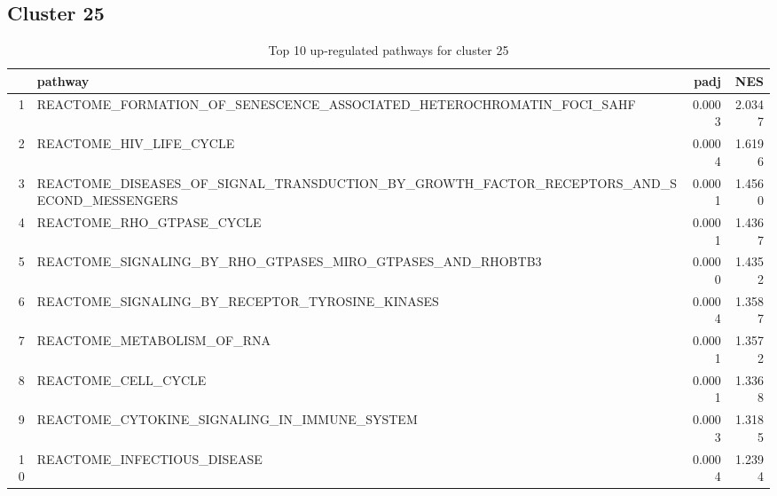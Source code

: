 \documentclass{article}
\begin{document}
\subsection{Cluster 25 }
\begin{table}[H]
\centering
\begin{tabularx}{\textwidth}{rlrr}
  \hline
 & pathway & padj & NES \\ 
  \hline
1 & REACTOME\_FORMATION\_OF\_SENESCENCE\_ASSOCIATED\_HETEROCHROMATIN\_FOCI\_SAHF & 0.0003 & 2.0347 \\ 
  2 & REACTOME\_HIV\_LIFE\_CYCLE & 0.0004 & 1.6196 \\ 
  3 & REACTOME\_DISEASES\_OF\_SIGNAL\_TRANSDUCTION\_BY\_GROWTH\_FACTOR\_RECEPTORS\_AND\_SECOND\_MESSENGERS & 0.0001 & 1.4560 \\ 
  4 & REACTOME\_RHO\_GTPASE\_CYCLE & 0.0001 & 1.4367 \\ 
  5 & REACTOME\_SIGNALING\_BY\_RHO\_GTPASES\_MIRO\_GTPASES\_AND\_RHOBTB3 & 0.0000 & 1.4352 \\ 
  6 & REACTOME\_SIGNALING\_BY\_RECEPTOR\_TYROSINE\_KINASES & 0.0004 & 1.3587 \\ 
  7 & REACTOME\_METABOLISM\_OF\_RNA & 0.0001 & 1.3572 \\ 
  8 & REACTOME\_CELL\_CYCLE & 0.0001 & 1.3368 \\ 
  9 & REACTOME\_CYTOKINE\_SIGNALING\_IN\_IMMUNE\_SYSTEM & 0.0003 & 1.3185 \\ 
  10 & REACTOME\_INFECTIOUS\_DISEASE & 0.0004 & 1.2394 \\ 
   \hline
\end{tabularx}
\caption{Top 10 up-regulated pathways for cluster 25} 
\label{tab:q3_2_25}
\end{table}
\end{document}
